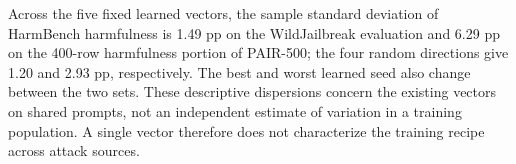 Across the five fixed learned vectors, the sample standard deviation of HarmBench harmfulness is 1.49 pp on the WildJailbreak evaluation and 6.29 pp on the 400-row harmfulness portion of PAIR-500; the four random directions give 1.20 and 2.93 pp, respectively. The best and worst learned seed also change between the two sets. These descriptive dispersions concern the existing vectors on shared prompts, not an independent estimate of variation in a training population. A single vector therefore does not characterize the training recipe across attack sources.
